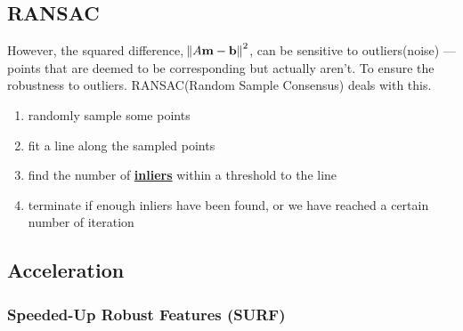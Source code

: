 \documentclass[twocolumn,landscape,10pt]{article}
\theoremstyle{definition}
\begin{document}
\subsection{RANSAC}

However, the squared difference, $\norm{A\mathbf{m}-\mathbf{b}}^2$, can be sensitive to
outliers(noise) --- points that are deemed to be corresponding but actually
aren't. To ensure the robustness to outliers. RANSAC(Random Sample Consensus) deals with this.
\begin{enumerate}
    \item randomly sample some points
    \item fit a line along the sampled points
    \item find the number of \underline{\textbf{inliers}} within a threshold to
        the line
    \item terminate if enough inliers have been found, or we have reached a
        certain number of iteration
\end{enumerate} 

\subsection{Acceleration}

\subsubsection{Speeded-Up Robust Features (SURF)}
\end{document}
